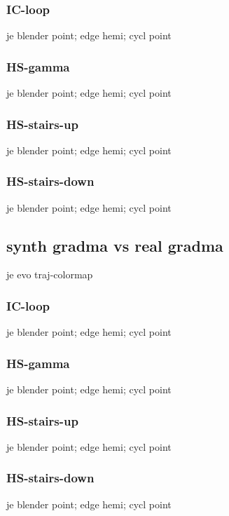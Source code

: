 \subsubsection{IC-loop}
je blender point; edge hemi; cycl point
\subsubsection{HS-gamma}
je blender point; edge hemi; cycl point
\subsubsection{HS-stairs-up}
je blender point; edge hemi; cycl point
\subsubsection{HS-stairs-down}
je blender point; edge hemi; cycl point

\subsection{synth gradma vs real gradma}
je evo traj-colormap
\subsubsection{IC-loop}
je blender point; edge hemi; cycl point
\subsubsection{HS-gamma}
je blender point; edge hemi; cycl point
\subsubsection{HS-stairs-up}
je blender point; edge hemi; cycl point
\subsubsection{HS-stairs-down}
je blender point; edge hemi; cycl point
